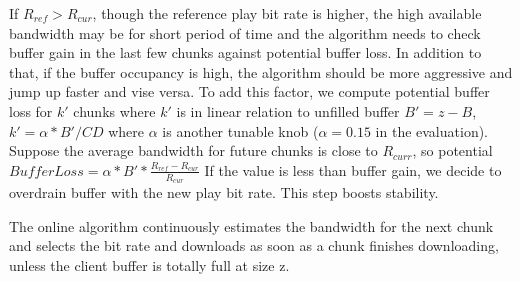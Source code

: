 If $R_{ref} >R_{cur} $, though the reference play bit rate is higher,
the high available bandwidth may be for short period of time and the
algorithm needs to check buffer gain in the last few chunks against
potential buffer loss. 
In addition to that, if the buffer occupancy is
high, the algorithm should be more aggressive and jump up faster and
vise versa. To add this factor, we compute potential buffer loss for
$k'$ chunks where $k'$ is in linear relation to unfilled buffer
$B'=z-B$, $k'=\alpha * B'/CD$ where $\alpha$ is another tunable knob ($\alpha=0.15$ in the evaluation). 
Suppose the average bandwidth for future chunks is close to $R_{curr}$,
so potential $BufferLoss=\alpha *
B' *\frac{R_{ref}-R_{cur}}{R_{cur}} $
If the value is less than buffer
gain, we decide to overdrain buffer with the new play bit rate. This
step boosts stability.


The online algorithm continuously estimates the bandwidth for the next
chunk and selects the bit rate and downloads as soon as a chunk finishes downloading, unless the client
buffer is totally full at size z.





